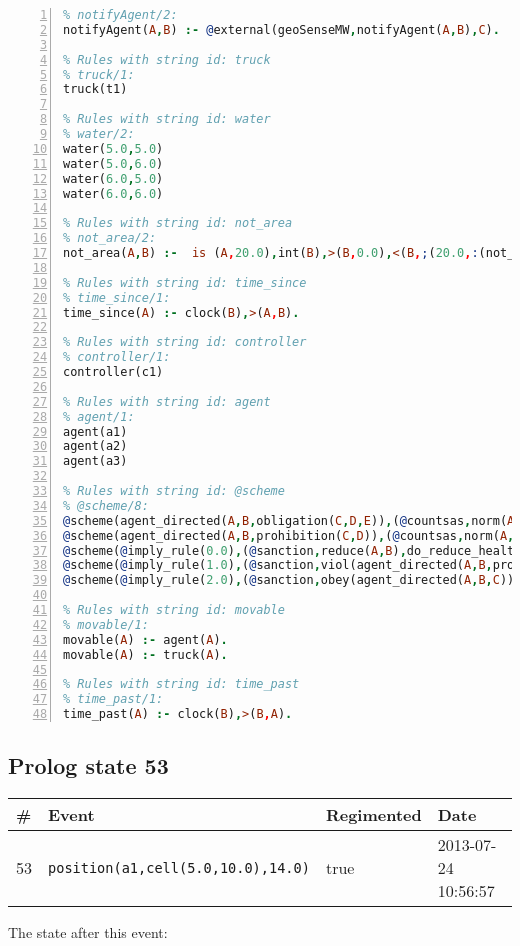 \documentclass[11pt]{article}\usepackage[utf8]{inputenc}\usepackage{geometry}
\begin{document}
\begin{lstlisting}[language=Prolog, numbers=left]
% Rules with string id: notifyAgent
% notifyAgent/2:
notifyAgent(A,B) :- @external(geoSenseMW,notifyAgent(A,B),C).

% Rules with string id: truck
% truck/1:
truck(t1)

% Rules with string id: water
% water/2:
water(5.0,5.0)
water(5.0,6.0)
water(6.0,5.0)
water(6.0,6.0)

% Rules with string id: not_area
% not_area/2:
not_area(A,B) :-  is (A,20.0),int(B),>(B,0.0),<(B,;(20.0,:(not_area(A,B), is (-(B),20.0)))),int(A),>(A,0.0),<(A,;(20.0,:(area(A,B),-(int(A))))),int(B),>(A,0.0),>(B,0.0),<(A,21.0),<(B,21.0).

% Rules with string id: time_since
% time_since/1:
time_since(A) :- clock(B),>(A,B).

% Rules with string id: controller
% controller/1:
controller(c1)

% Rules with string id: agent
% agent/1:
agent(a1)
agent(a2)
agent(a3)

% Rules with string id: @scheme
% @scheme/8:
@scheme(agent_directed(A,B,obligation(C,D,E)),(@countsas,norm(A,B,F,obligation(C,D,E)),F),false,(listTrue(C)),(time_past(D)),false,[plus(viol(agent_directed(A,B,obligation(C,D,E))))|[]],[plus(obey(agent_directed(A,B,obligation(C,D,E))))|[]])
@scheme(agent_directed(A,B,prohibition(C,D)),(@countsas,norm(A,B,E,prohibition(C,D)),E),(listTrue(C)),false,(false),false,[plus(viol(agent_directed(A,B,prohibition(C,D))))|[]],[plus(obey(agent_directed(A,B,prohibition(C,D))))|[]])
@scheme(@imply_rule(0.0),(@sanction,reduce(A,B),do_reduce_health(A,B),notifyAgent(A,changed(status))),true,false,false,false,[min(reduce(A,B))|[]],[])
@scheme(@imply_rule(1.0),(@sanction,viol(agent_directed(A,B,prohibition(C,D))),do_sanction(D)),true,false,false,false,[min(viol(agent_directed(A,B,prohibition(C,D))))|[]],[])
@scheme(@imply_rule(2.0),(@sanction,obey(agent_directed(A,B,C))),true,false,false,false,[min(obey(agent_directed(A,B,C)))|[]],[])

% Rules with string id: movable
% movable/1:
movable(A) :- agent(A).
movable(A) :- truck(A).

% Rules with string id: time_past
% time_past/1:
time_past(A) :- clock(B),>(B,A).

\end{lstlisting}
\clearpage 
\subsection{Prolog state 53}
\begin{table}[ht]
\centering 
\begin{tabular}{l l l l} 
\textbf{\#} & \textbf{Event} & \textbf{Regimented} & \textbf{Date} \\ [0.5ex] 
\hline
53&\texttt{position(a1,cell(5.0,10.0),14.0)}&true&2013-07-24 10:56:57\\ [1ex] \hline\end{tabular}
\end{table}
The state after this event:
\end{document}
